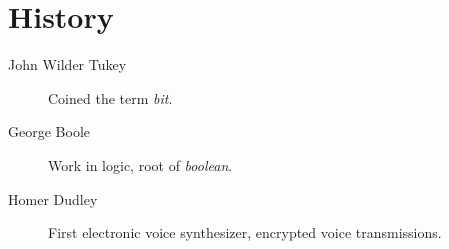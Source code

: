 \chapter{History}

\begin{description}
  \item[John Wilder Tukey] Coined the term \textit{bit}.
  \item[George Boole] Work in logic, root of \textit{boolean}.
  \item[Homer Dudley] First electronic voice synthesizer, encrypted voice
                      transmissions.
\end{description}
